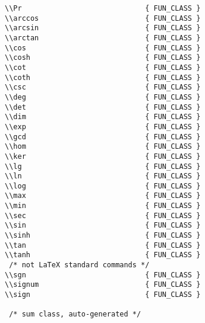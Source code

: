 \begin{verbatim}
\\Pr                             { FUN_CLASS }
\\arccos                         { FUN_CLASS }
\\arcsin                         { FUN_CLASS }
\\arctan                         { FUN_CLASS }
\\cos                            { FUN_CLASS }
\\cosh                           { FUN_CLASS }
\\cot                            { FUN_CLASS }
\\coth                           { FUN_CLASS }
\\csc                            { FUN_CLASS }
\\deg                            { FUN_CLASS }
\\det                            { FUN_CLASS }
\\dim                            { FUN_CLASS }
\\exp                            { FUN_CLASS }
\\gcd                            { FUN_CLASS }
\\hom                            { FUN_CLASS }
\\ker                            { FUN_CLASS }
\\lg                             { FUN_CLASS }
\\ln                             { FUN_CLASS }
\\log                            { FUN_CLASS }
\\max                            { FUN_CLASS }
\\min                            { FUN_CLASS }
\\sec                            { FUN_CLASS }
\\sin                            { FUN_CLASS }
\\sinh                           { FUN_CLASS }
\\tan                            { FUN_CLASS }
\\tanh                           { FUN_CLASS }
 /* not LaTeX standard commands */
\\sgn                            { FUN_CLASS }
\\signum                         { FUN_CLASS }
\\sign                           { FUN_CLASS }

 /* sum class, auto-generated */


\end{verbatim}
